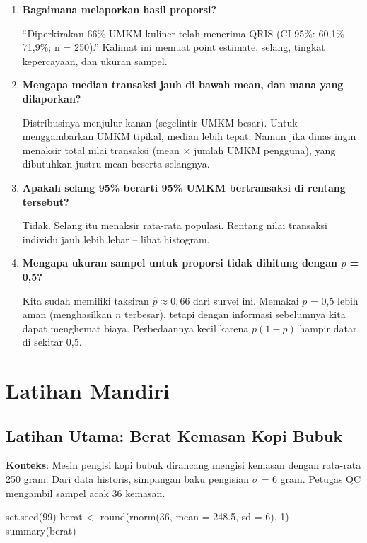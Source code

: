 \documentclass[
  indonesian,
  letterpaper,
]{book}
\newenvironment{Shaded}{\begin{snugshade}}{\end{snugshade}}
\newcommand{\AttributeTok}[1]{\textcolor[rgb]{0.40,0.45,0.13}{#1}}
\newcommand{\DecValTok}[1]{\textcolor[rgb]{0.68,0.00,0.00}{#1}}
\newcommand{\FloatTok}[1]{\textcolor[rgb]{0.68,0.00,0.00}{#1}}
\newcommand{\FunctionTok}[1]{\textcolor[rgb]{0.28,0.35,0.67}{#1}}
\newcommand{\NormalTok}[1]{\textcolor[rgb]{0.00,0.23,0.31}{#1}}
\newcommand{\OtherTok}[1]{\textcolor[rgb]{0.00,0.23,0.31}{#1}}
\begin{document}
\begin{enumerate}
\def\labelenumi{\arabic{enumi}.}
\item
  \textbf{Bagaimana melaporkan hasil proporsi?}

  ``Diperkirakan 66\% UMKM kuliner telah menerima QRIS (CI 95\%:
  60,1\%--71,9\%; n = 250).'' Kalimat ini memuat point estimate, selang,
  tingkat kepercayaan, dan ukuran sampel.
\item
  \textbf{Mengapa median transaksi jauh di bawah mean, dan mana yang
  dilaporkan?}

  Distribusinya menjulur kanan (segelintir UMKM besar). Untuk
  menggambarkan UMKM tipikal, median lebih tepat. Namun jika dinas ingin
  menaksir total nilai transaksi (mean × jumlah UMKM pengguna), yang
  dibutuhkan justru mean beserta selangnya.
\item
  \textbf{Apakah selang 95\% berarti 95\% UMKM bertransaksi di rentang
  tersebut?}

  Tidak. Selang itu menaksir rata-rata populasi. Rentang nilai transaksi
  individu jauh lebih lebar -- lihat histogram.
\item
  \textbf{Mengapa ukuran sampel untuk proporsi tidak dihitung dengan
  \(p\) = 0,5?}

  Kita sudah memiliki taksiran \(\hat{p} \approx 0{,}66\) dari survei
  ini. Memakai \(p\) = 0,5 lebih aman (menghasilkan \(n\) terbesar),
  tetapi dengan informasi sebelumnya kita dapat menghemat biaya.
  Perbedaannya kecil karena \(p(1-p)\) hampir datar di sekitar 0,5.
\end{enumerate}

\section{Latihan Mandiri}\label{latihan-mandiri}

\subsection{Latihan Utama: Berat Kemasan Kopi
Bubuk}\label{latihan-utama-berat-kemasan-kopi-bubuk}

\textbf{Konteks}: Mesin pengisi kopi bubuk dirancang mengisi kemasan
dengan rata-rata 250 gram. Dari data historis, simpangan baku pengisian
\(\sigma\) = 6 gram. Petugas QC mengambil sampel acak 36 kemasan.

\begin{Shaded}
\begin{Highlighting}[]
\FunctionTok{set.seed}\NormalTok{(}\DecValTok{99}\NormalTok{)}
\NormalTok{berat }\OtherTok{\textless{}{-}} \FunctionTok{round}\NormalTok{(}\FunctionTok{rnorm}\NormalTok{(}\DecValTok{36}\NormalTok{, }\AttributeTok{mean =} \FloatTok{248.5}\NormalTok{, }\AttributeTok{sd =} \DecValTok{6}\NormalTok{), }\DecValTok{1}\NormalTok{)}
\FunctionTok{summary}\NormalTok{(berat)}
\end{Highlighting}
\end{Shaded}
\end{document}
